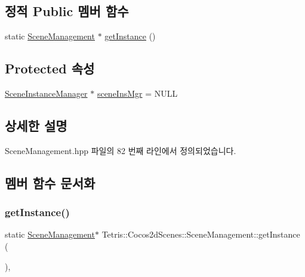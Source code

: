 \subsection*{정적 Public 멤버 함수}
\begin{DoxyCompactItemize}
\item 
static \hyperlink{class_tetris_1_1_cocos2d_scenes_1_1_scene_management}{Scene\+Management} $\ast$ \hyperlink{class_tetris_1_1_cocos2d_scenes_1_1_scene_management_a34a3edec2de526ee179491cc6ae8aac3}{get\+Instance} ()
\end{DoxyCompactItemize}
\subsection*{Protected 속성}
\begin{DoxyCompactItemize}
\item 
\hyperlink{class_tetris_1_1_cocos2d_scenes_1_1_scene_instance_manager}{Scene\+Instance\+Manager} $\ast$ \hyperlink{class_tetris_1_1_cocos2d_scenes_1_1_scene_management_a0ac07876072adcaefdcb86f9911475ba}{scene\+Ins\+Mgr} = N\+U\+LL
\end{DoxyCompactItemize}


\subsection{상세한 설명}


Scene\+Management.\+hpp 파일의 82 번째 라인에서 정의되었습니다.



\subsection{멤버 함수 문서화}
\mbox{\label{class_tetris_1_1_cocos2d_scenes_1_1_scene_management_a34a3edec2de526ee179491cc6ae8aac3}} 
\subsubsection{\texorpdfstring{get\+Instance()}{getInstance()}}
{\footnotesize\ttfamily static \hyperlink{class_tetris_1_1_cocos2d_scenes_1_1_scene_management}{Scene\+Management}$\ast$ Tetris\+::\+Cocos2d\+Scenes\+::\+Scene\+Management\+::get\+Instance (\begin{DoxyParamCaption}{ }\end{DoxyParamCaption})\hspace{0.3cm}{\ttfamily [inline]}, {\ttfamily [static]}}



